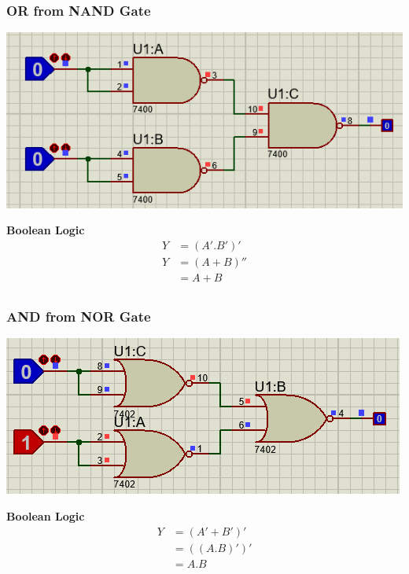 \documentclass[a4paper, 12pt]{article}
\begin{document}
\subsubsection{OR from NAND Gate}
\begin{center}
  \includegraphics[scale=0.75]{nand-or}
\end{center}
\textbf{Boolean Logic}
\begin{equation} 
\begin{split}
  Y & = (A' . B')' \\
  Y & = (A+B)'' \\
    & = A+B\\
\end{split}
\end{equation}

\subsubsection{AND from NOR Gate}
\begin{center}
  \includegraphics[scale=0.75]{nor-and}
\end{center}
\textbf{Boolean Logic}
\begin{equation} 
\begin{split}
  Y & = (A' + B')'\\ 
    & = ((A.B)')' \\
    & = A.B \\
\end{split}
\end{equation}
\end{document}
